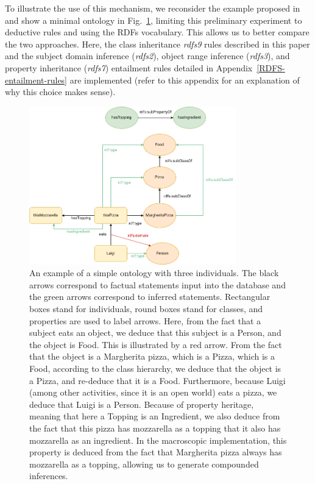 \documentclass[sn-mathphys]{sn-jnl}
\begin{document}
To illustrate the use of this mechanism, we reconsider the example proposed in \cite{mercier_ontology_2021} and show a minimal ontology in Fig.~\ref{Pizza}, limiting this preliminary experiment to deductive rules and using the RDFs vocabulary. This allows us to better compare the two approaches. Here, the class inheritance \textit{rdfs9} rules described in this paper and the subject domain inference (\textit{rdfs2}), object range inference (\textit{rdfs3}), and property inheritance (\textit{rdfs7}) entailment rules detailed in Appendix~\ref{RDFS-entailment-rules} are implemented (refer to this appendix for an explanation of why this choice makes sense).

\begin{figure}[htbp]
\centerline{\includegraphics[width=0.8\textwidth]{./pizza-aristotle.png}}
\caption{An example of a simple ontology with three individuals. The black arrows correspond to factual statements input into the database and the green arrows correspond to inferred statements. Rectangular boxes stand for individuals, round boxes stand for classes, and properties are used to label arrows. Here, from the fact that a subject eats an object, we deduce that this subject is a Person, and the object is Food. This is illustrated by a red arrow. From the fact that the object is a Margherita pizza, which is a Pizza, which is a Food, according to the class hierarchy, we deduce that the object is a Pizza, and re-deduce that it is a Food. Furthermore, because Luigi (among other activities, since it is an open world) eats a pizza, we deduce that Luigi is a Person. Because of property heritage, meaning that here a Topping is an Ingredient, we also deduce from the fact that this pizza has mozzarella as a topping that it also has mozzarella as an ingredient. In the macroscopic implementation, this property is deduced from the fact that Margherita pizza always has mozzarella as a topping, allowing us to generate compounded inferences.}
\label{Pizza}
\end{figure}
\end{document}
